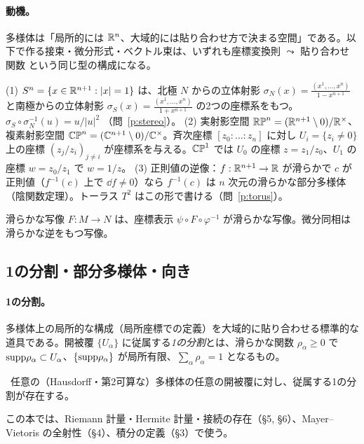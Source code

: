 \paragraph{動機。}多様体は「局所的には $\mathbb R^n$、大域的には貼り合わせ方で決まる空間」である。以下で作る接束・微分形式・ベクトル束は、いずれも座標変換則 $\leadsto$ 貼り合わせ関数 という同じ型の構成になる。

\begin{ex}\label{ex:sphere}
(1) $S^n=\{x\in\mathbb R^{n+1}:|x|=1\}$ は、北極 $N$ からの立体射影 $\sigma_N(x)=\frac{(x^1,\dots,x^n)}{1-x^{n+1}}$ と南極からの立体射影 $\sigma_S(x)=\frac{(x^1,\dots,x^n)}{1+x^{n+1}}$ の2つの座標系をもつ。$\sigma_S\circ\sigma_N^{-1}(u)=u/|u|^2$ （問~\ref{p:stereo}）。
(2) 実射影空間 $\mathbb{RP}^n=(\mathbb R^{n+1}\setminus 0)/\mathbb R^\times$、複素射影空間 $\mathbb{CP}^n=(\mathbb C^{n+1}\setminus0)/\mathbb C^\times$。斉次座標 $[z_0:\dots:z_n]$ に対し $U_i=\{z_i\ne0\}$ 上の座標 $(z_j/z_i)_{j\ne i}$ が座標系を与える。$\mathbb{CP}^1$ では $U_0$ の座標 $z=z_1/z_0$、$U_1$ の座標 $w=z_0/z_1$ で $w=1/z$。
(3) 正則値の逆像：$f:\mathbb R^{n+1}\to\mathbb R$ が滑らかで $c$ が正則値（$f^{-1}(c)$ 上で $\dd f\neq0$）なら $f^{-1}(c)$ は $n$ 次元の滑らかな部分多様体（陰関数定理）。トーラス $T^2$ はこの形で書ける（問~\ref{p:torus}）。
\end{ex}
\tC

滑らかな写像 $F:M\to N$ は、座標表示 $\psi\circ F\circ\varphi^{-1}$ が滑らかな写像。微分同相は滑らかな逆をもつ写像。


\subsection{1の分割・部分多様体・向き}
\paragraph{1の分割。}多様体上の局所的な構成（局所座標での定義）を大域的に貼り合わせる標準的な道具である。開被覆 $\{U_\alpha\}$ に従属する\emph{1の分割}とは、滑らかな関数 $\rho_\alpha\ge0$ で $\mathrm{supp}\rho_\alpha\subset U_\alpha$、$\{\mathrm{supp}\rho_\alpha\}$ が局所有限、$\sum_\alpha\rho_\alpha=1$ となるもの。
\begin{thm}[1の分割の存在]\tC\
任意の（Hausdorff・第2可算な）多様体の任意の開被覆に対し、従属する1の分割が存在する。
\end{thm}
この本では、Riemann 計量・Hermite 計量・接続の存在（§5, §6）、Mayer--Vietoris の全射性（§4）、積分の定義（§3）で使う。

